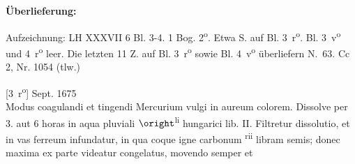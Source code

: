 \begin{ledgroupsized}[r]{120mm}%
\footnotesize%
\pstart%
\noindent\textbf{\"{U}berlieferung:}%
\pend%
\end{ledgroupsized}%
%
\begin{ledgroupsized}[r]{114mm}%
\footnotesize%
\pstart%
\parindent -6mm%
%
Aufzeichnung: LH XXXVII 6 Bl. 3-4.
1 Bog. 2\textsuperscript{o}. Etwa  S. auf Bl. 3~r\textsuperscript{o}.
Bl. 3~v\textsuperscript{o} und 4~r\textsuperscript{o} leer.
Die letzten 11 Z. auf Bl. 3~r\textsuperscript{o} sowie Bl. 4~v\textsuperscript{o} überliefern N.~63. %
\newline%
Cc 2, Nr. 1054 (tlw.)%
\pend%
\end{ledgroupsized}%
%
\vspace{6mm}%
\count{}
\count{}
\count{}
\pstart%
\normalsize%
\noindent%
[3~r\textsuperscript{o}] 
Sept. 1675%
\\
Modus coagulandi et tingendi Mercurium\protect{} vulgi in aureum colorem.
Dissolve per 3. aut 6 horas in aqua pluviali\protect{} $\oright$\textsuperscript{li} hungarici\protect{} lib. II.
Filtretur dissolutio, et in vas ferreum infundatur, in qua coque igne carbonum \mercury \textsuperscript{rii}\protect{} libram semis; donec maxima ex parte videatur congelatus, movendo semper et%
